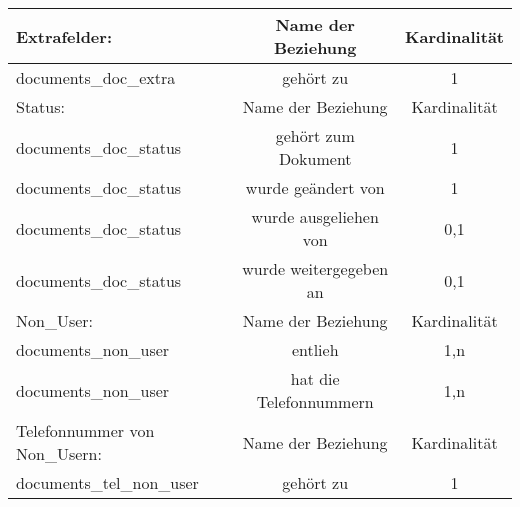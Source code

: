 \begin{tabular}[ht]{|l||c|c|}
  Extrafelder:  & Name der Beziehung &  Kardinalit\"at\\
  \hline\hline
  documents\_doc\_extra & gehört zu & 1 \\
  \hline\hline\hline
  
  Status: & Name der Beziehung & Kardinalität\\
  \hline\hline
  documents\_doc\_status & gehört zum Dokument & 1\\
  \hline
  documents\_doc\_status & wurde geändert von & 1\\
  \hline
  documents\_doc\_status & wurde ausgeliehen von & 0,1\\
  \hline
  documents\_doc\_status & wurde weitergegeben an & 0,1\\
  \hline\hline\hline
  
  Non\_User: & Name der Beziehung & Kardinalität\\
  \hline\hline
  documents\_non\_user & entlieh & 1,n\\
  \hline
  documents\_non\_user & hat die Telefonnummern & 1,n\\
  \hline\hline\hline
  
  Telefonnummer von Non\_Usern:  & Name der Beziehung &  Kardinalit\"at\\
  \hline\hline
  documents\_tel\_non\_user & gehört zu & 1 \\
  \hline
\end{tabular}

